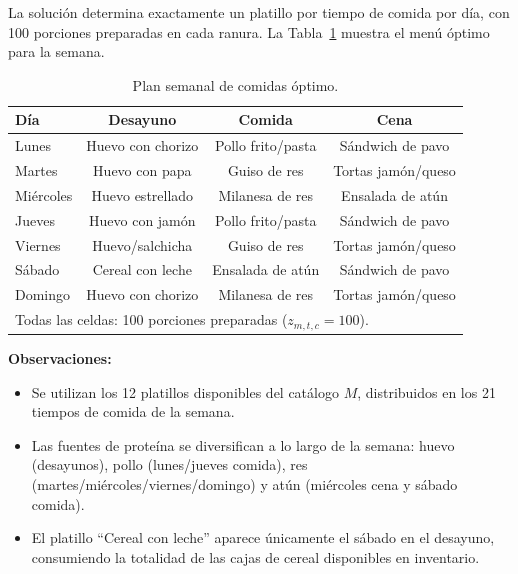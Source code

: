 \documentclass[12pt, a4paper]{article}
\begin{document}
La solución determina exactamente un platillo por tiempo de comida por día,
con 100 porciones preparadas en cada ranura. La Tabla~\ref{tab:menu} muestra
el menú óptimo para la semana.

\begin{table}[h!]
\centering
\renewcommand{\arraystretch}{1.35}
\begin{tabular}{lccc}
\toprule
\textbf{Día} & \textbf{Desayuno} & \textbf{Comida} & \textbf{Cena} \\
\midrule
Lunes      & Huevo con chorizo  & Pollo frito/pasta  & Sándwich de pavo   \\
Martes     & Huevo con papa     & Guiso de res       & Tortas jamón/queso \\
Miércoles  & Huevo estrellado   & Milanesa de res    & Ensalada de atún   \\
Jueves     & Huevo con jamón    & Pollo frito/pasta  & Sándwich de pavo   \\
Viernes    & Huevo/salchicha    & Guiso de res       & Tortas jamón/queso \\
Sábado     & Cereal con leche   & Ensalada de atún   & Sándwich de pavo   \\
Domingo    & Huevo con chorizo  & Milanesa de res    & Tortas jamón/queso \\
\midrule
\multicolumn{4}{l}{\small Todas las celdas: 100 porciones preparadas ($z_{m,t,c} = 100$).} \\
\bottomrule
\end{tabular}
\caption{Plan semanal de comidas óptimo.}
\label{tab:menu}
\end{table}

\noindent\textbf{Observaciones:}
\begin{itemize}
    \item Se utilizan los 12 platillos disponibles del catálogo $M$, distribuidos
          en los 21 tiempos de comida de la semana.
    \item Las fuentes de proteína se diversifican a lo largo de la semana:
          huevo (desayunos), pollo (lunes/jueves comida), res (martes/miércoles/viernes/domingo)
          y atún (miércoles cena y sábado comida).
    \item El platillo ``Cereal con leche'' aparece únicamente el sábado en el desayuno,
          consumiendo la totalidad de las cajas de cereal disponibles en inventario.
\end{itemize}

\end{document}
